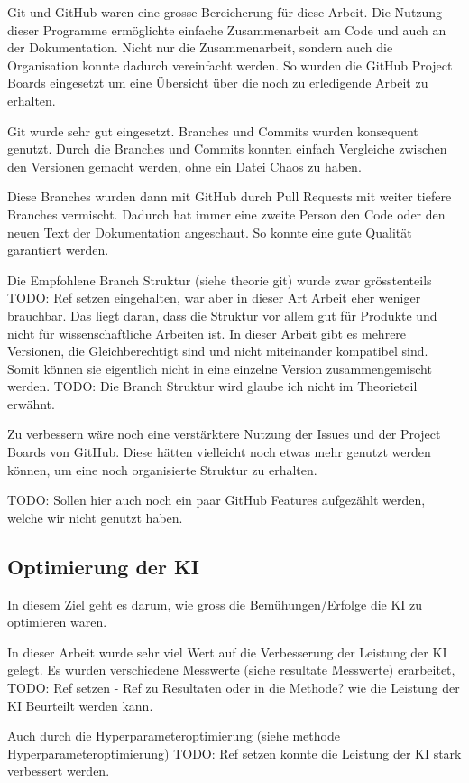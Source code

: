 Git und GitHub waren eine grosse Bereicherung für diese Arbeit. Die
Nutzung dieser Programme ermöglichte einfache Zusammenarbeit am Code und auch an
der Dokumentation. Nicht nur die Zusammenarbeit, sondern auch die Organisation
konnte dadurch vereinfacht werden. So wurden die GitHub Project Boards
eingesetzt um eine Übersicht über die noch zu erledigende Arbeit zu erhalten.

Git wurde sehr gut eingesetzt. Branches und Commits wurden konsequent genutzt.
Durch die Branches und Commits konnten einfach Vergleiche zwischen den Versionen
gemacht werden, ohne ein Datei Chaos zu haben.

Diese Branches wurden dann mit GitHub durch Pull Requests mit weiter tiefere
Branches vermischt. Dadurch hat immer eine zweite Person den Code oder den neuen
Text der Dokumentation angeschaut. So konnte eine gute Qualität garantiert
werden.

Die Empfohlene Branch Struktur (siehe theorie git) wurde zwar grösstenteils  TODO: Ref setzen
eingehalten, war aber in dieser Art Arbeit eher weniger brauchbar. Das liegt
daran, dass die Struktur vor allem gut für Produkte und nicht für
wissenschaftliche Arbeiten ist. In dieser Arbeit gibt es mehrere Versionen, die
Gleichberechtigt sind und nicht miteinander kompatibel sind. Somit können sie
eigentlich nicht in eine einzelne Version zusammengemischt werden.
TODO: Die Branch Struktur wird glaube ich nicht im Theorieteil erwähnt.

Zu verbessern wäre noch eine verstärktere Nutzung der Issues und der Project
Boards von GitHub. Diese hätten vielleicht noch etwas mehr genutzt werden
können, um eine noch organisierte Struktur zu erhalten.

TODO: Sollen hier auch noch ein paar GitHub Features aufgezählt werden, welche wir nicht genutzt haben.


\subsection*{Optimierung der KI}
In diesem Ziel geht es darum, wie gross die Bemühungen/Erfolge die KI zu
optimieren waren.

In dieser Arbeit wurde sehr viel Wert auf die Verbesserung der Leistung der KI
gelegt. Es wurden verschiedene Messwerte (siehe resultate Messwerte) erarbeitet,  TODO: Ref setzen - Ref zu Resultaten oder in die Methode?
wie die Leistung der KI Beurteilt werden kann.

Auch durch die Hyperparameteroptimierung (siehe methode Hyperparameteroptimierung) TODO: Ref setzen
konnte die Leistung der KI stark verbessert werden.


